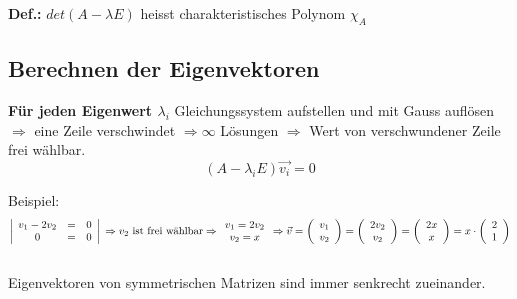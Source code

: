 		\textbf{Def.:} $det(A - \lambda E)$ heisst charakteristisches Polynom $\chi_A$\\

	\subsection{Berechnen der Eigenvektoren}
		\textbf{Für jeden Eigenwert $\lambda_i$}  Gleichungssystem aufstellen und mit Gauss auflösen $\Rightarrow$ eine Zeile
		verschwindet $\Rightarrow \infty$ Lösungen $\Rightarrow$ Wert von verschwundener Zeile frei wählbar.
		\begin{equation*}
			(A - \lambda_i E)\vec{v_i} = 0
		\end{equation*}

		Beispiel:
		\begin{equation*}
			\left|\begin{array}{ccc}
				v_1 - 2v_2 & = & 0\\
				0 & = & 0
			\end{array}\right| \\
			\Rightarrow \\
			v_2 \text{ ist frei wählbar} \\
			\Rightarrow \\
			\begin{array}{c}
				v_1 = 2v_2\\
				v_2 = x
			\end{array} \\
			\Rightarrow \\
			\vec{v} = \left(\begin{array}{c}
				v_1 \\
				v_2
			\end{array}\right) = \left(\begin{array}{c}
				2v_2\\
				v_2
			\end{array}\right) = \left(\begin{array}{c}
				2x \\
				x
			\end{array}\right) = x \cdot \left(\begin{array}{c}
				2 \\
				1
			\end{array}\right)
		\end{equation*}\\
	Eigenvektoren von symmetrischen Matrizen sind immer senkrecht zueinander.\\
	
